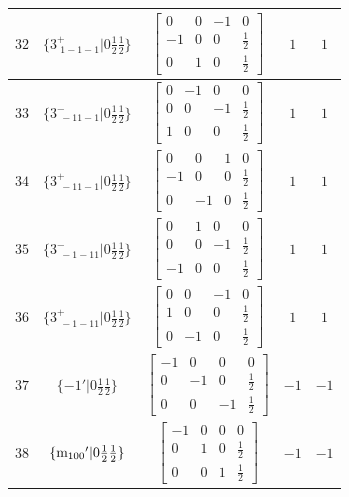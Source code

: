 \documentclass[fleqn,8pt]{jsarticle}
\begin{document}
\begin{longtable}{ccccc}
$ 32 $ & $ \{3^{+}_{\,\,1-1-1}|0 \frac{1}{2} \frac{1}{2}\} $ & $ \begin{bmatrix} 0 & 0 & -1 & 0 \\ -1 & 0 & 0 & \frac{1}{2} \\ 0 & 1 & 0 & \frac{1}{2} \end{bmatrix} $ & $ 1 $ & $ 1 $ \\ \hline
$ 33 $ & $ \{3^{-}_{\,\,-11-1}|0 \frac{1}{2} \frac{1}{2}\} $ & $ \begin{bmatrix} 0 & -1 & 0 & 0 \\ 0 & 0 & -1 & \frac{1}{2} \\ 1 & 0 & 0 & \frac{1}{2} \end{bmatrix} $ & $ 1 $ & $ 1 $ \\ \hline
$ 34 $ & $ \{3^{+}_{\,\,-11-1}|0 \frac{1}{2} \frac{1}{2}\} $ & $ \begin{bmatrix} 0 & 0 & 1 & 0 \\ -1 & 0 & 0 & \frac{1}{2} \\ 0 & -1 & 0 & \frac{1}{2} \end{bmatrix} $ & $ 1 $ & $ 1 $ \\ \hline
$ 35 $ & $ \{3^{-}_{\,\,-1-11}|0 \frac{1}{2} \frac{1}{2}\} $ & $ \begin{bmatrix} 0 & 1 & 0 & 0 \\ 0 & 0 & -1 & \frac{1}{2} \\ -1 & 0 & 0 & \frac{1}{2} \end{bmatrix} $ & $ 1 $ & $ 1 $ \\ \hline
$ 36 $ & $ \{3^{+}_{\,\,-1-11}|0 \frac{1}{2} \frac{1}{2}\} $ & $ \begin{bmatrix} 0 & 0 & -1 & 0 \\ 1 & 0 & 0 & \frac{1}{2} \\ 0 & -1 & 0 & \frac{1}{2} \end{bmatrix} $ & $ 1 $ & $ 1 $ \\ \hline
$ 37 $ & $ \{-1{}'|0 \frac{1}{2} \frac{1}{2}\} $ & $ \begin{bmatrix} -1 & 0 & 0 & 0 \\ 0 & -1 & 0 & \frac{1}{2} \\ 0 & 0 & -1 & \frac{1}{2} \end{bmatrix} $ & $ -1 $ & $ -1 $ \\ \hline
$ 38 $ & $ \{{\rm m}_{100}{}'|0 \frac{1}{2} \frac{1}{2}\} $ & $ \begin{bmatrix} -1 & 0 & 0 & 0 \\ 0 & 1 & 0 & \frac{1}{2} \\ 0 & 0 & 1 & \frac{1}{2} \end{bmatrix} $ & $ -1 $ & $ -1 $ \\ \hline

\end{longtable}
\end{document}
